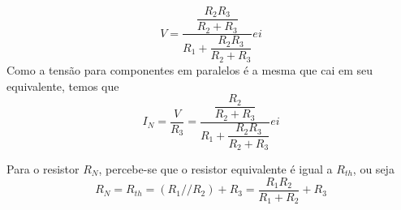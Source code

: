 \documentclass{article}
\numberwithin{equation}{section}
\newlength\Colsep
\begin{document}
    \vspace{1.2cm}

    \noindent\begin{minipage}{\textwidth}
    \begin{minipage}[c][4cm][c]{\dimexpr0.5\textwidth-0.5\Colsep\relax}
        \begin{center}
        \end{center}
    \end{minipage}
    \begin{minipage}[c][4cm][c]{\dimexpr0.5\textwidth-0.5\Colsep\relax}
        $$V=\dfrac{\dfrac{R_2R_3}{R_2+R_3}}{R_1+\dfrac{R_2R_3}{R_2+R_3}}ei$$
        Como a tensão para componentes em paralelos é a mesma que cai em seu equivalente, temos que
        $$I_N=\frac{V}{R_3}=\dfrac{\dfrac{R_2}{R_2+R_3}}{R_1+\dfrac{R_2R_3}{R_2+R_3}}ei$$
    \end{minipage}
    \end{minipage}

    \noindent\begin{minipage}{\textwidth}
    \begin{minipage}[c][4cm][c]{\dimexpr0.5\textwidth-0.5\Colsep\relax}
        \begin{center}
        \end{center}
    \end{minipage}
    \begin{minipage}[c][4cm][c]{\dimexpr0.5\textwidth-0.5\Colsep\relax}
        Para o resistor $R_N$, percebe-se que o resistor equivalente é igual a $R_{th}$, ou seja
        $$R_{N}=R_{th}=(R_1//R_2)+R_3=\frac{R_1R_2}{R_1+R_2}+R_3$$
    \end{minipage}
    \end{minipage}
\end{document}
